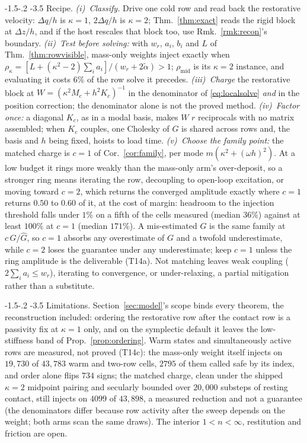 \documentclass[sigconf,screen,review,anonymous]{acmart}
\makeatletter
\newcommand{\rih}{\def\@toclevel{4}%
  \@startsection{paragraph}{4}{\parindent}%
  {-1.5\p@ \@plus -1\p@ \@minus -.2\p@}%
  {-3.5\p@}%
  {\ACM@NRadjust{\@parfont\@adddotafter}}}
\newcommand{\Rr}{w_{r}}
\newcommand{\oh}{\omega h}
\theoremstyle{acmdefinition}
\makeatother
\begin{document}
\rih{Recipe.} \emph{(i)~Classify.} Drive one cold row and read back the
restorative velocity: $\Delta q/h$ is $\kappa = 1$, $2\Delta q/h$ is
$\kappa = 2$; Thm.~\ref{thm:exact} reads the rigid block at $\Delta z/h$, and
if the host rescales that block too, use Rmk.~\ref{rmk:recon}'s boundary.
\emph{(ii)~Test before solving:} with $\Rr$, $a_i$, $b_i$ and $L$ of
Thm.~\ref{thm:rowvisible}, mass-only weights inject exactly when
$\rho_{\kappa} = [L + (\kappa^2 - 2)\sum_i a_i]/(\Rr + 2\tilde\alpha) > 1$;
$\rho_{\mathrm{mid}}$ is its $\kappa = 2$ instance, and evaluating it costs
$6\%$ of the row solve it precedes. \emph{(iii)~Charge} the restorative block at
$W = (\kappa^2 M_c + h^2 K_c)^{-1}$ in the denominator of \eqref{eq:localsolve}
\emph{and} in the position correction; the denominator alone is not the proved
method. \emph{(iv)~Factor once:} a diagonal $K_c$, as in a modal basis, makes
$W$ $r$ reciprocals with no matrix assembled; when $K_c$ couples, one Cholesky
of $G$ is shared across rows and, the basis and $h$ being fixed, hoists to load
time. \emph{(v)~Choose the family point:} the matched charge
is $c = 1$ of Cor.~\ref{cor:family}, per mode $m(\kappa^2 + (\oh)^2)$. At a low
budget it rings more weakly
than the mass-only arm's over-deposit, so a stronger ring means iterating the
row, decoupling to open-loop excitation, or moving toward $c = 2$, which returns the converged amplitude exactly
where $c = 1$ returns $0.50$ to $0.60$ of it, at the cost of margin: headroom to
the injection threshold falls under $1\%$ on a fifth of the cells measured
(median $36\%$) against at least $100\%$ at $c = 1$ (median $171\%$). A
mis-estimated $G$ is the same family at $c\,G/\hat{G}$, so $c = 1$ absorbs any
overestimate of $G$ and a twofold underestimate, while $c = 2$ loses the
guarantee under any underestimate; keep $c = 1$ unless the ring amplitude
is the deliverable (T14a).
Not matching leaves weak coupling ($2\sum_i a_i \le \Rr$), iterating to
convergence, or under-relaxing, a partial mitigation rather than a substitute.

\rih{Limitations.} Section~\ref{sec:model}'s scope binds every theorem, the
reconstruction included: ordering the restorative row after the contact row is a
passivity fix at $\kappa = 1$ only, and on the symplectic default it leaves the
low-stiffness band of Prop.~\ref{prop:ordering}. Warm states and simultaneously
active rows are measured, not proved (T14c): the mass-only weight itself injects
on $19{,}730$ of $43{,}783$ warm and two-row cells, $2795$ of them called safe by
its index, and order alone flips $734$ signs; the matched charge, clean under the
shipped $\kappa = 2$ midpoint pairing and secularly bounded over $20{,}000$
substeps of resting contact, still injects on $4099$ of $43{,}898$, a measured
reduction and not a guarantee (the denominators differ because row activity after
the sweep depends on the weight; both arms scan the same draws). The interior
$1 < n < \infty$,
restitution and friction are open.



\end{document}
